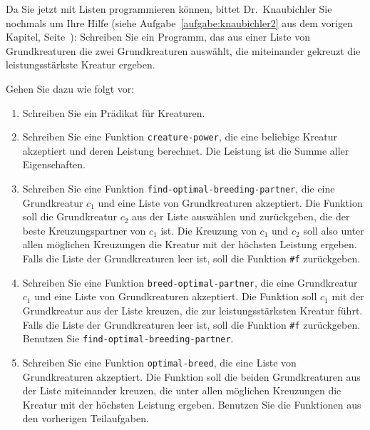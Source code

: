 \begin{aufgabe}
  Da Sie jetzt mit Listen programmieren können, bittet Dr.~Knaubichler
  Sie nochmals um Ihre Hilfe (siehe Aufgabe~\ref{aufgabe:knaubichler2}
  aus dem vorigen Kapitel, Seite~\pageref{aufgabe:knaubichler2}):
  Schreiben Sie ein Programm, das aus einer Liste von Grundkreaturen
  die zwei Grundkreaturen auswählt, die miteinander gekreuzt die
  leistungsstärkste Kreatur ergeben.

  Gehen Sie dazu wie folgt vor:

  \begin{enumerate}
  \item Schreiben Sie ein Prädikat für Kreaturen.

  \item Schreiben Sie eine Funktion
    \texttt{creature-power}, die eine beliebige Kreatur akzeptiert und
    deren Leistung berechnet.  Die Leistung ist die Summe aller
    Eigenschaften.

  \item  Schreiben Sie eine Funktion
    \texttt{find-optimal-breeding-partner}, die eine Grundkreatur
    $c_1$ und eine Liste von Grundkreaturen akzeptiert.  Die Funktion
    soll die Grundkreatur $c_2$ aus der Liste auswählen und
    zurückgeben, die der beste Kreuzungspartner von $c_1$ ist.  Die
    Kreuzung von $c_1$ und $c_2$ soll also unter allen möglichen
    Kreuzungen die Kreatur mit der höchsten Leistung ergeben.  Falls
    die Liste der Grundkreaturen leer ist, soll die Funktion \verb|#f|
    zurückgeben.

  \item  Schreiben Sie eine Funktion
    \texttt{breed-optimal-partner}, die eine Grundkreatur $c_1$ und
    eine Liste von Grundkreaturen akzeptiert.  Die Funktion soll $c_1$
    mit der Grundkreatur aus der Liste kreuzen, die zur
    leistungsstärksten Kreatur führt.  Falls die Liste der
    Grundkreaturen leer ist, soll die Funktion \verb|#f| zurückgeben.
    Benutzen Sie \texttt{find-optimal-breeding-partner}.

  \item  Schreiben Sie eine Funktion
    \texttt{optimal-breed}, die eine Liste von Grundkreaturen
    akzeptiert.  Die Funktion soll die beiden Grundkreaturen aus der
    Liste miteinander kreuzen, die unter allen möglichen Kreuzungen
    die Kreatur mit der höchsten Leistung ergeben.  Benutzen Sie die
    Funktionen aus den vorherigen Teilaufgaben.

  \end{enumerate}
\end{aufgabe}

